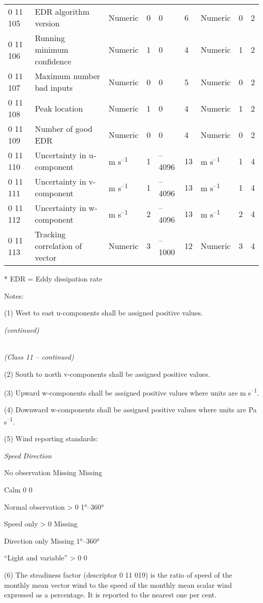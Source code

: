 \begin{longtable}[]{@{}lllllllll@{}}
0 11 105 & EDR algorithm version & Numeric & 0 & 0 & 6 & Numeric & 0 & 2\tabularnewline
0 11 106 & Running minimum confidence & Numeric & 1 & 0 & 4 & Numeric & 1 & 2\tabularnewline
0 11 107 & Maximum number bad inputs & Numeric & 0 & 0 & 5 & Numeric & 0 & 2\tabularnewline
0 11 108 & Peak location & Numeric & 1 & 0 & 4 & Numeric & 1 & 2\tabularnewline
0 11 109 & Number of good EDR & Numeric & 0 & 0 & 4 & Numeric & 0 & 2\tabularnewline
0 11 110 & Uncertainty in u-component & m s\textsuperscript{--1} & 1 & --4096 & 13 & m s\textsuperscript{--1} & 1 & 4\tabularnewline
0 11 111 & Uncertainty in v-component & m s\textsuperscript{--1} & 1 & --4096 & 13 & m s\textsuperscript{--1} & 1 & 4\tabularnewline
0 11 112 & Uncertainty in w-component & m s\textsuperscript{--1} & 2 & --4096 & 13 & m s\textsuperscript{--1} & 2 & 4\tabularnewline
0 11 113 & Tracking correlation of vector & Numeric & 3 & --1000 & 12 & Numeric & 3 & 4\tabularnewline
\bottomrule
\end{longtable}

* EDR = Eddy dissipation rate

Notes:

(1) West to east u-components shall be assigned positive values.

\emph{(continued)}

\emph{\\
(Class 11 -- continued)}

(2) South to north v-components shall be assigned positive values.

(3) Upward w-components shall be assigned positive values where units are m s\textsuperscript{--1}.

(4) Downward w-components shall be assigned positive values where units are Pa s\textsuperscript{--1}.

(5) Wind reporting standards:

\emph{Speed} \emph{Direction}

No observation Missing Missing

Calm 0 0

Normal observation \textgreater{} 0 1°--360°

Speed only \textgreater{} 0 Missing

Direction only Missing 1°--360°

``Light and variable'' \textgreater{} 0 0

(6) The steadiness factor (descriptor 0 11 019) is the ratio of speed of the monthly mean vector wind to the speed of the monthly mean scalar wind expressed as a percentage. It is reported to the nearest one per cent.

